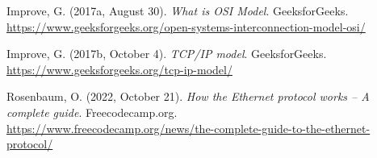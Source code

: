 \documentclass{article}
\begin{document}
\begin{thebibliography}{9}
	Improve, G. (2017a, August 30). \textit{What is OSI Model}. GeeksforGeeks. \\ 
	\url{https://www.geeksforgeeks.org/open-systems-interconnection-model-osi/}

	Improve, G. (2017b, October 4). \textit{TCP/IP model}. GeeksforGeeks. \\ 
	\url{https://www.geeksforgeeks.org/tcp-ip-model/}

	Rosenbaum, O. (2022, October 21). \textit{How the Ethernet protocol works – A complete guide}. Freecodecamp.org. \\ 
	\url{https://www.freecodecamp.org/news/the-complete-guide-to-the-ethernet-protocol/}
\end{thebibliography}
\end{document}
